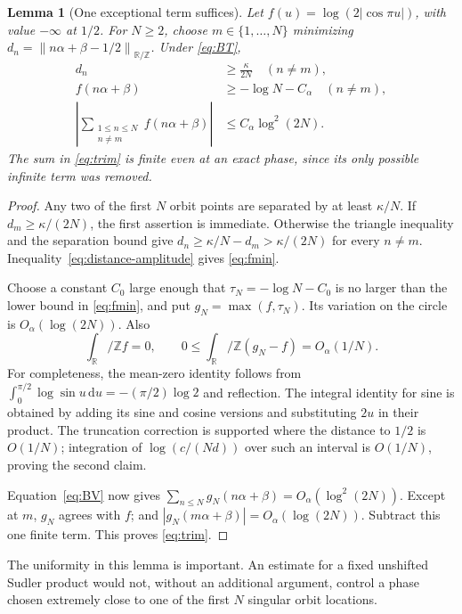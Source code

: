 \documentclass[11pt,a4paper]{article}
\newtheorem{lemma}[theorem]{Lemma}
\theoremstyle{definition}
\theoremstyle{remark}\newtheorem{remark}[theorem]{Remark}
\newcommand{\T}{\mathbb R/\mathbb Z}
\newcommand{\dn}[1]{\left\|#1\right\|_{\T}}
\newcommand{\dd}{\,\mathrm d}
\begin{document}
\begin{lemma}[One exceptional term suffices]
\label{lem:trim}
Let $f(u)=\log(2|\cos\pi u|)$, with value $-\infty$ at $1/2$.
For $N\ge2$, choose $m\in\{1,\ldots,N\}$ minimizing
$d_n=\dn{n\alpha+\beta-1/2}$.  Under \eqref{eq:BT},
\begin{align}
 d_n&\ge\frac{\kappa}{2N}\quad(n\ne m),\label{eq:spacing}\\
 f(n\alpha+\beta)&\ge-\log N-C_\alpha\quad(n\ne m),
 \label{eq:fmin}\\
 \left|\sum_{\substack{1\le n\le N\\n\ne m}}
               f(n\alpha+\beta)\right|
 &\le C_\alpha\log^2(2N).
 \label{eq:trim}
\end{align}
The sum in \eqref{eq:trim} is finite even at an exact phase, since its only
possible infinite term was removed.
\end{lemma}
\begin{proof}
Any two of the first $N$ orbit points are separated by at least $\kappa/N$.
If $d_m\ge\kappa/(2N)$, the first assertion is immediate.  Otherwise the
triangle inequality and the separation bound give
$d_n\ge\kappa/N-d_m>\kappa/(2N)$ for every $n\ne m$.
Inequality~\eqref{eq:distance-amplitude} gives \eqref{eq:fmin}.

Choose a constant $C_0$ large enough that
$\tau_N=-\log N-C_0$ is no larger than the lower bound in
\eqref{eq:fmin}, and put $g_N=\max(f,\tau_N)$.
Its variation on the circle is $O_\alpha(\log(2N))$.  Also
\begin{equation}
 \int_\T f=0,\qquad
 0\le\int_\T(g_N-f)=O_\alpha(1/N).
 \label{eq:truncatedmean}
\end{equation}
For completeness, the mean-zero identity follows from
$\int_0^{\pi/2}\log\sin u\dd u=-(\pi/2)\log2$ and reflection.
The integral identity for sine is obtained by adding its sine and cosine
versions and substituting $2u$ in their product.  The truncation correction
is supported where the distance to $1/2$ is $O(1/N)$; integration of
$\log(c/(Nd))$ over such an interval is $O(1/N)$, proving the second claim.

Equation~\eqref{eq:BV} now gives
$\sum_{n\le N}g_N(n\alpha+\beta)=O_\alpha(\log^2(2N))$.
Except at $m$, $g_N$ agrees with $f$; and
$|g_N(m\alpha+\beta)|=O_\alpha(\log(2N))$.
Subtract this one finite term.  This proves \eqref{eq:trim}.
\end{proof}

The uniformity in this lemma is important.  An estimate for a fixed unshifted
Sudler product would not, without an additional argument, control a phase
chosen extremely close to one of the first $N$ singular orbit locations.
\end{document}
